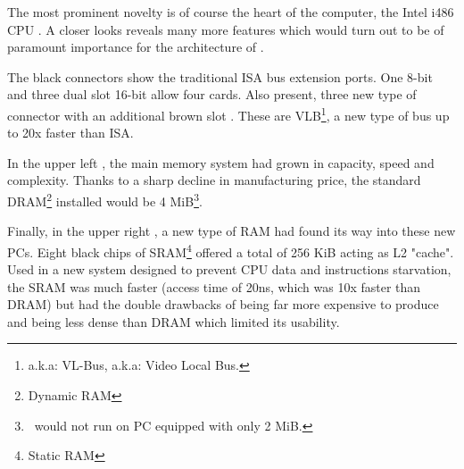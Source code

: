 \par
The most prominent novelty is of course the heart of the computer, the Intel i486 CPU . A closer looks reveals many more features which would turn out to be of paramount importance for the architecture of \doom.\\
\par 
The black connectors show the traditional ISA bus extension ports. One 8-bit  and three dual slot 16-bit  allow four cards. Also present, three new type of connector with an additional brown slot . These are VLB\footnote{a.k.a: VL-Bus, a.k.a: Video Local Bus.}, a new type of bus up to 20x faster than ISA.

\par
In the upper left , the main memory system had grown in capacity, speed and complexity. Thanks to a sharp decline in manufacturing price, the standard DRAM\footnote{Dynamic RAM} installed would be 4 MiB\footnote{\doom~would not run on PC equipped with only 2 MiB.}.\\
\par
 Finally, in the upper right , a new type of RAM had found its way into these new PCs. Eight black chips of SRAM\footnote{Static RAM} offered a total of 256 KiB acting as L2 "cache". Used in a new system designed to prevent CPU data and instructions starvation, the SRAM was much faster (access time of 20ns, which was 10x faster than DRAM) but had the double drawbacks of being far more expensive to produce and being less dense than DRAM which limited its usability.



